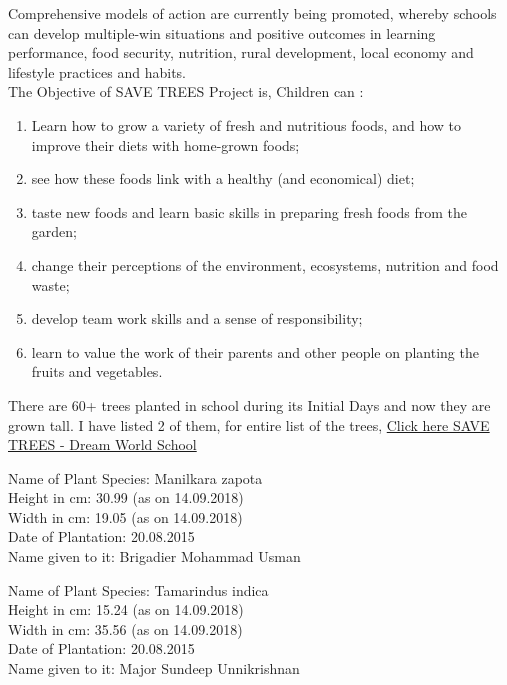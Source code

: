 Comprehensive models of action are currently being promoted, whereby schools can develop multiple-win situations and positive outcomes in learning performance, food security, nutrition, rural development, local economy and lifestyle practices and habits.\\

The Objective of SAVE TREES Project is, Children can : 
\begin{enumerate}
\item Learn how to grow a variety of fresh and nutritious foods, and how to improve their diets with home-grown foods; 
\item see how these foods link with a healthy (and economical) diet;
\item taste new foods and learn basic skills in preparing fresh foods from the garden;
\item change their perceptions of the environment, ecosystems, nutrition and food waste; 
\item develop team work skills and a sense of 
responsibility;
\item learn to value the work of their parents 
and other people on planting the fruits 
and vegetables.
\end{enumerate}

There are 60+ trees planted in school during its Initial Days and now they are grown tall. I have listed 2 of them, for entire list of the trees, \href{http://www.dreamworldschool.com/PDF/Save-Trees.pdf}{Click here SAVE TREES - Dream World School} 

\begin{tcolorbox}[coltitle=black,colframe=yellow!90,fonttitle=\sffamily\bfseries\large,title=Sapodilla]
Name of Plant Species: Manilkara zapota\\
Height in cm: 30.99 (as on 14.09.2018)\\
Width in cm: 19.05 (as on 14.09.2018)\\
Date of Plantation: 20.08.2015\\
Name given to it: Brigadier Mohammad Usman\\
\end{tcolorbox}

\begin{tcolorbox}[coltitle=black,colframe=yellow!90,fonttitle=\sffamily\bfseries\large,title=Tamarind]
Name of Plant Species: Tamarindus indica \\
Height in cm: 15.24 (as on 14.09.2018) \\
Width in cm: 35.56 (as on 14.09.2018) \\
Date of Plantation: 20.08.2015 \\
Name given to it: Major Sundeep Unnikrishnan \\
\end{tcolorbox}

